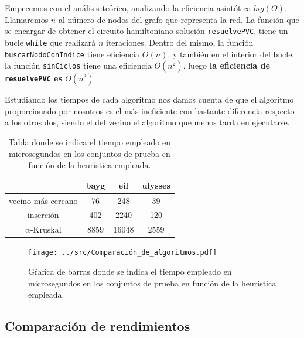 


Empecemos con el análisis teórico, analizando la eficiencia asintótica $big(O)$. Llamaremos $n$ al número 
de nodos del grafo que representa la red. La función que se encargar de obtener el circuito hamiltoniano 
solución \texttt{resuelvePVC}, tiene un bucle \texttt{while} que realizará $n$ iteraciones. Dentro del mismo, 
la función \texttt{buscarNodoConIndice} tiene eficiencia $O(n)$, y también en el interior del bucle, la 
función \texttt{sinCiclos} tiene una eficiencia $O(n^2)$, luego \textbf{la eficiencia de \texttt{resuelvePVC} es $O(n^3)$}.


Estudiando los tiempos de cada algoritmo nos damos cuenta de que el algoritmo proporcionado por nosotros es el más ineficiente
con bastante diferencia respecto a los otros dos, siendo el del vecino el algoritmo que menos tarda en ejecutarse.

\begin{table}[H]
  \centering
  \begin{tabular}{|c|c|c|c|}
    \hline
    & bayg & eil & ulysses \\
    \hline
    vecino más cercano & 76 & 248 & 39 \\
    \hline
    inserción & 402 & 2240 & 120 \\
    \hline
    $\alpha$-Kruskal & 8859 & 16048 & 2559 \\
    \hline
  \end{tabular}
  \caption{Tabla donde se indica el tiempo empleado en microsegundos en los conjuntos de prueba en función de la heurística empleada.}
\end{table}


\begin{figure}[H]
  \centering
  \texttt{[image: ../src/Comparación\_de\_algoritmos.pdf]}
  \caption{Gŕafica de barras donde se indica el tiempo empleado en microsegundos en los conjuntos de prueba en función de la heurística empleada.}
\end{figure}

\subsection{Comparación de rendimientos}

